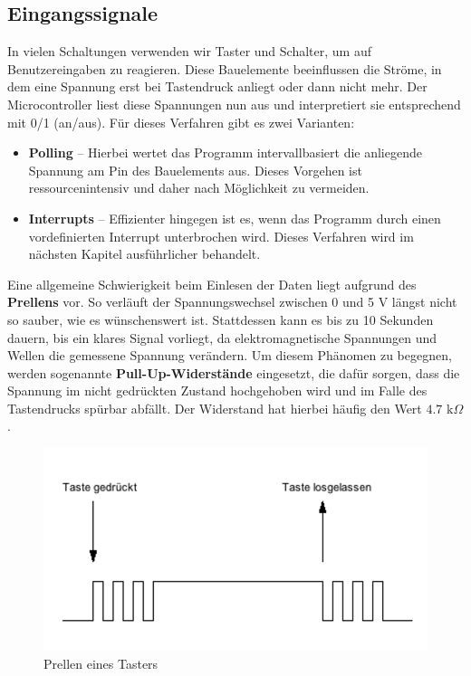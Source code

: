 \documentclass[11pt,a4paper]{scrartcl}
\begin{document}
\subsection{Eingangssignale}
In vielen Schaltungen verwenden wir Taster und Schalter, um auf Benutzereingaben zu reagieren. Diese Bauelemente beeinflussen die Ströme, in dem eine Spannung erst bei Tastendruck anliegt oder dann nicht mehr. Der Microcontroller liest diese Spannungen nun aus und interpretiert sie entsprechend mit 0/1 (an/aus). Für dieses Verfahren gibt es zwei Varianten:
\begin{itemize}
\item \textbf{Polling} -- Hierbei wertet das Programm intervallbasiert die anliegende Spannung am Pin des Bauelements aus. Dieses Vorgehen ist ressourcenintensiv und daher nach Möglichkeit zu vermeiden.
\item \textbf{Interrupts} -- Effizienter hingegen ist es, wenn das Programm durch einen vordefinierten Interrupt unterbrochen wird. Dieses Verfahren wird im nächsten Kapitel ausführlicher behandelt.
\end{itemize}
Eine allgemeine Schwierigkeit beim Einlesen der Daten liegt aufgrund des \textbf{Prellens} vor. So verläuft der Spannungswechsel zwischen 0 und 5 V längst nicht so sauber, wie es wünschenswert ist. Stattdessen kann es bis zu 10 Sekunden dauern, bis ein klares Signal vorliegt,
 da elektromagnetische Spannungen und Wellen die gemessene Spannung verändern. Um diesem Phänomen zu begegnen, werden sogenannte \textbf{Pull-Up-Widerstände} eingesetzt, die dafür sorgen, dass die Spannung im nicht gedrückten Zustand {\glqq}hochgehoben{\grqq} wird und im Falle des Tastendrucks spürbar abfällt. Der Widerstand hat hierbei häufig den Wert $4.7 \text{ k}\Omega$.
\begin{figure}[h!]
\centering
\includegraphics[scale=0.6]{prellen.png}
\caption{Prellen eines Tasters}
\end{figure}
\end{document}
